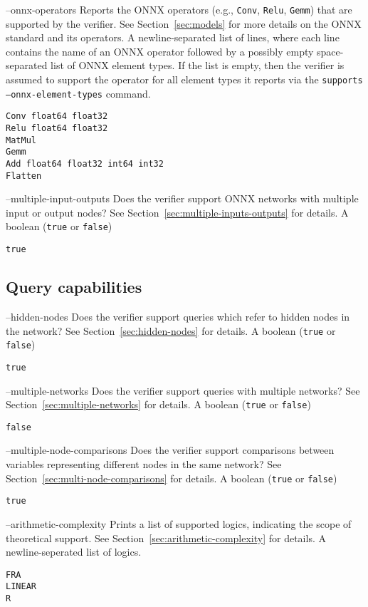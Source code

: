 \clOutputOption
{--onnx-operators}
{Reports the ONNX operators (e.g., \texttt{Conv}, \texttt{Relu}, \texttt{Gemm}) that are supported by the verifier. See Section~\ref{sec:models} for more details on the ONNX standard and its operators. 
}
{A newline-separated list of lines, where each line contains the name of an ONNX operator followed by a possibly empty space-separated list of ONNX element types. If the list is empty, then the verifier is assumed to support the operator for all element types it reports via the \texttt{supports --onnx-element-types} command.
}
\begin{lstlisting}[style=bash]
%*\exampleVerifier* supports --onnx-operators
Conv float64 float32
Relu float64 float32
MatMul
Gemm
Add float64 float32 int64 int32
Flatten
\end{lstlisting}

\clOutputOption
{--multiple-input-outputs}
{Does the verifier support ONNX networks with multiple input or output nodes? See Section~\ref{sec:multiple-inputs-outputs} for details.}
{A boolean (\texttt{true} or \texttt{false})}
\begin{lstlisting}[style=bash]
%*\exampleVerifier* supports --multiple-inputs-outputs
true
\end{lstlisting}

\subsection{Query capabilities}

\clOutputOption
{--hidden-nodes}
{Does the verifier support queries which refer to hidden nodes in the network? See Section~\ref{sec:hidden-nodes} for details.}
{A boolean (\texttt{true} or \texttt{false})}
\begin{lstlisting}[style=bash]
%*\exampleVerifier* supports --hidden-nodes
true
\end{lstlisting}

\clOutputOption
{--multiple-networks}
{Does the verifier support queries with multiple networks? See Section~\ref{sec:multiple-networks} for details.}
{A boolean (\texttt{true} or \texttt{false})}
\begin{lstlisting}[style=bash]
%*\exampleVerifier* supports --multiple-networks
false
\end{lstlisting}

\clOutputOption
{--multiple-node-comparisons}
{Does the verifier support comparisons between variables representing different nodes in the same network? See Section~\ref{sec:multi-node-comparisons} for details.}
{A boolean (\texttt{true} or \texttt{false})}
\begin{lstlisting}[style=bash]
%*\exampleVerifier* supports --multiple-node-comparisons
true
\end{lstlisting}

\clOutputOption
{--arithmetic-complexity}
{Prints a list of supported \vnnlib{} logics, indicating the scope of theoretical support. See Section~\ref{sec:arithmetic-complexity} for details.
}
{A newline-seperated list of logics.}
\begin{lstlisting}[style=bash]
%*\exampleVerifier* supports --logics
FRA
LINEAR
R
\end{lstlisting}



